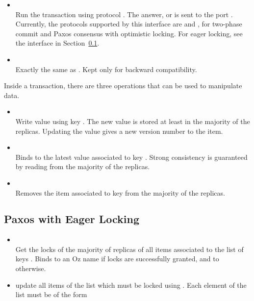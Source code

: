 \begin{itemize}

\item {}\\ Run the transaction
 using protocol . The answer,  or
 is sent to the port . Currently, the protocols
supported by this interface are  and , for
two-phase commit and Paxos consensus with optimistic locking. For eager
locking, see the interface in Section~\ref{apx:beernet:eager-locking}.

\item {}\\ Exactly the same as
. Kept only for backward compatibility.

\end{itemize}

Inside a transaction, there are three operations that can be used to
manipulate data.

\begin{itemize}

\item {}\\ Write value  using key . The
new value is stored at least in the majority of the replicas. Updating the
value gives a new version number to the item.

\item {}\\ Binds  to the latest value associated
to key . Strong consistency is guaranteed by reading from the
majority of the replicas. 

\item {}\\ Removes the item associated to key  from
the majority of the replicas.

\end{itemize}

\subsection{Paxos with Eager Locking}
\label{apx:beernet:eager-locking}

\begin{itemize}

\item {}\\ Get the locks of the majority of
replicas of all items associated to the list of keys . Binds
 to an Oz name if locks are successfully granted, and to
 otherwise.

\item {} update all items of the
list  which must be locked using . Each
element of the list  must be of the form

\end{itemize}

